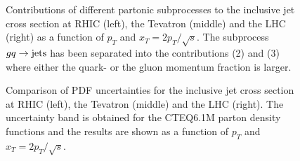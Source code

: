 \begin{figure}[t]
\centerline{
}
  \caption{Contributions of different partonic subprocesses to 
   the inclusive jet cross section at 
   RHIC (left), the Tevatron (middle) and the LHC (right)
   as a function of $p_T$ and $x_T = 2 p_T/\sqrt{s}$.
   The subprocess $gq \rightarrow {\rm jets}$ has been
   separated into the contributions (2) and (3) where either the 
   quark- or the gluon momentum fraction is larger.
  \label{fig:fnsubprocpp}}
\end{figure}



\begin{figure}[t]
\centerline{
}
  \caption{Comparison of PDF uncertainties for 
   the inclusive jet cross section at 
   RHIC (left), the Tevatron (middle) and the LHC (right).
   The uncertainty band is obtained for the CTEQ6.1M 
   parton density functions and the results are shown
   as a function of $p_T$ and $x_T = 2 p_T/\sqrt{s}$.
  \label{fig:fnpdfuncpp}}
\end{figure}


